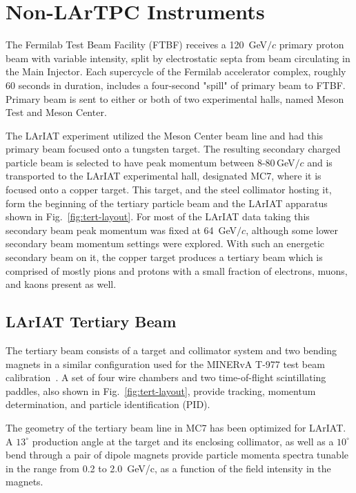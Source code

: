 \section{Non-LArTPC Instruments}\label{sec:FTBF}
The Fermilab Test Beam Facility (FTBF) receives a 120~GeV$/c$ primary proton beam with variable intensity, split by electrostatic septa from beam circulating in the Main Injector. Each supercycle of the Fermilab accelerator complex, roughly 60 seconds in duration, includes a four-second "spill" of primary beam to FTBF. Primary beam is sent to either or both of two experimental halls, named Meson Test and Meson Center.  

The LArIAT experiment utilized the Meson Center beam line and had this primary beam focused onto a tungsten target. The resulting secondary charged particle beam is selected to have peak momentum between 8-80\,GeV$/c$ and is transported to the LArIAT experimental hall, designated MC7, where it is focused onto a copper target. This target, and the steel collimator hosting it, form the beginning of the tertiary particle beam and the LArIAT apparatus shown in  Fig.~\ref{fig:tert-layout}.  For most of the LArIAT data taking this secondary beam peak momentum was fixed at 64~GeV$/c$, although some lower secondary beam momentum settings were explored.  With such an energetic secondary beam on it, the copper target produces a tertiary beam which is comprised of mostly pions and protons with a small fraction of electrons, muons, and kaons present as well. 

\subsection{LArIAT Tertiary Beam}\label{sec:TertiaryBeam}

The tertiary beam consists of a target and collimator system and two bending magnets in a similar configuration used for the  MINERvA T-977 test beam calibration~\cite{MinervaTestbeam}. A set of four wire chambers and two time-of-flight scintillating paddles, also shown in Fig.~\ref{fig:tert-layout}, provide tracking, momentum determination, and particle identification (PID). 

The geometry of the tertiary beam line in MC7 has been optimized for LArIAT.  A $13^\circ$ production angle at the target and its enclosing collimator, as well as a $10^\circ$ bend through a pair of dipole magnets provide particle momenta spectra tunable in the range from 0.2 to 2.0~GeV/c, as a function of the field intensity in the magnets.

